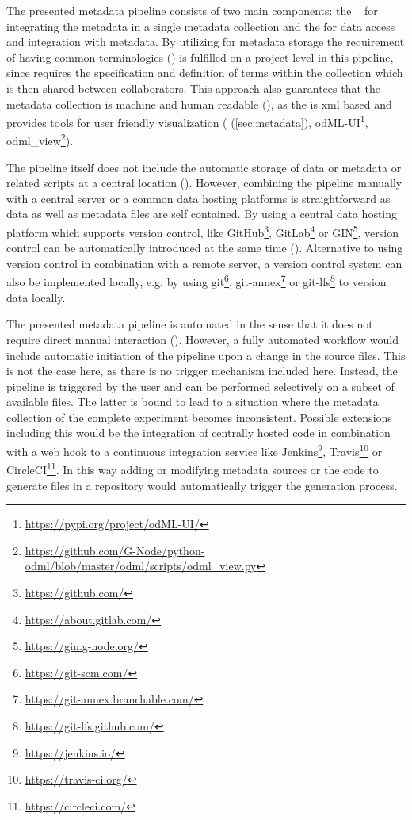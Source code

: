 The presented metadata pipeline consists of two main components: the \  for integrating the metadata in a single  metadata collection and the  for data access and integration with metadata. By utilizing  for metadata storage the requirement of having common terminologies () is fulfilled on a project level in this pipeline, since  requires the specification and definition of terms within the collection which is then shared between collaborators. This approach also guarantees that the metadata collection is machine and human readable (), as the  is xml based and provides tools for user friendly visualization ( (\cref{sec:metadata}), odML-UI\footnote{\url{https://pypi.org/project/odML-UI/}}, odml\_view\footnote{\url{https://github.com/G-Node/python-odml/blob/master/odml/scripts/odml_view.py}}).

The pipeline itself does not include the automatic storage of data or metadata or related scripts at a central location (). However, combining the pipeline manually with a central server or a common data hosting platforms is straightforward as data as well as metadata files are self contained. By using a central data hosting platform which supports version control, like GitHub\footnote{\url{https://github.com/}}, GitLab\footnote{\url{https://about.gitlab.com/}} or GIN\footnote{\url{https://gin.g-node.org/}}, version control can be automatically introduced at the same time (). Alternative to using version control in combination with a remote server, a version control system can also be implemented locally, e.g. by using git\footnote{\url{https://git-scm.com/}}, git-annex\footnote{\url{https://git-annex.branchable.com/}} or git-lfs\footnote{\url{https://git-lfs.github.com/}} to version data locally.

The presented metadata pipeline is automated in the sense that it does not require direct manual interaction (). However, a fully automated workflow would include automatic initiation of the pipeline upon a change in the source files. This is not the case here, as there is no trigger mechanism included here. Instead, the pipeline is triggered by the user and can be performed selectively on a subset of available files. The latter is bound to lead to a situation where the metadata collection of the complete experiment becomes inconsistent. Possible extensions including this would be the integration of centrally hosted code in combination with a web hook to a continuous integration service like Jenkins\footnote{\url{https://jenkins.io/}}, Travis\footnote{\url{https://travis-ci.org/}} or CircleCI\footnote{\url{https://circleci.com/}}. In this way adding or modifying metadata sources or the code to generate  files in a repository would automatically trigger the  generation process.

